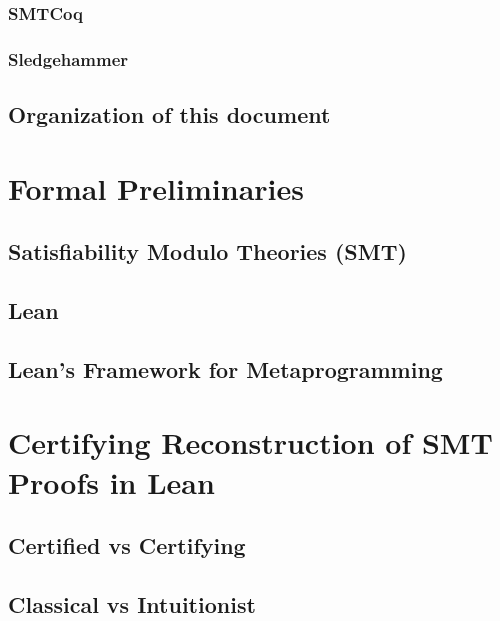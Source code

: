 \documentclass[
	msc,
	english
]{ppgccufmg}
\begin{document}
	    \subsection{SMTCoq}
           \label{sec:smtcoq}
			
		\subsection{Sledgehammer}
           \label{sec:sledgehammer}
			
	  \section{Organization of this document}
	    
	\chapter{Formal Preliminaries}
	  \section{Satisfiability Modulo Theories (SMT)}
	    
	  \section{Lean}
      
	  \section{Lean's Framework for Metaprogramming}
	\chapter{Certifying Reconstruction of SMT Proofs in Lean}
	  \section{Certified vs Certifying}
      \label{sec:certifiedVsCertifying}
	  \section{Classical vs Intuitionist}
\end{document}
